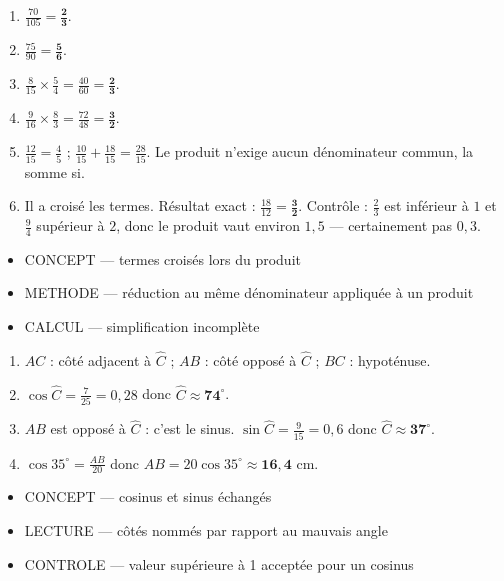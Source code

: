 \documentclass[10pt,a4paper]{article}
\begin{document}
\begin{enumerate}
\item $\frac{70}{105}=\mathbf{\frac{2}{3}}$.
\item $\frac{75}{90}=\mathbf{\frac{5}{6}}$.
\item $\frac{8}{15}\times\frac{5}{4}=\frac{40}{60}=\mathbf{\frac{2}{3}}$.
\item $\frac{9}{16}\times\frac{8}{3}=\frac{72}{48}=\mathbf{\frac{3}{2}}$.
\item $\frac{12}{15}=\frac45$ ; $\frac{10}{15}+\frac{18}{15}=\frac{28}{15}$. Le produit n'exige aucun dénominateur commun, la somme si.
\item Il a croisé les termes. Résultat exact : $\frac{18}{12}=\mathbf{\frac{3}{2}}$. Contrôle : $\frac23$ est inférieur à $1$ et $\frac94$ supérieur à $2$, donc le produit vaut environ $1{,}5$ — certainement pas $0{,}3$.
\end{enumerate}
\begin{itemize}
\item \textsc{CONCEPT} --- termes croisés lors du produit
\item \textsc{METHODE} --- réduction au même dénominateur appliquée à un produit
\item \textsc{CALCUL} --- simplification incomplète
\end{itemize}
\begin{enumerate}
\item $AC$ : côté adjacent à $\widehat{C}$ ; $AB$ : côté opposé à $\widehat{C}$ ; $BC$ : hypoténuse.
\item $\cos\widehat{C}=\frac{7}{25}=0{,}28$ donc $\widehat{C}\approx \mathbf{74^\circ}$.
\item $AB$ est opposé à $\widehat{C}$ : c'est le sinus. $\sin\widehat{C}=\frac{9}{15}=0{,}6$ donc $\widehat{C}\approx \mathbf{37^\circ}$.
\item $\cos 35^\circ = \frac{AB}{20}$ donc $AB = 20\cos 35^\circ \approx \mathbf{16{,}4}$ cm.
\end{enumerate}
\begin{itemize}
\item \textsc{CONCEPT} --- cosinus et sinus échangés
\item \textsc{LECTURE} --- côtés nommés par rapport au mauvais angle
\item \textsc{CONTROLE} --- valeur supérieure à 1 acceptée pour un cosinus
\end{itemize}
\end{document}
